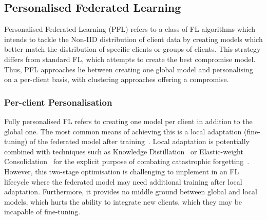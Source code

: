 \subsection{Personalised Federated Learning}

Personalised Federated Learning (PFL) refers to a class of FL algorithms which intends to tackle the Non-IID distribution of client data by creating models which better match the distribution of specific clients or groups of clients. This strategy differs from standard FL, which attempts to create the best compromise model. Thus, PFL approaches lie between creating one global model and personalising on a per-client basis, with clustering approaches offering a compromise.

\subsubsection{Per-client Personalisation}

Fully personalised FL refers to creating one model per client in addition to the global one. The most common means of achieving this is a local adaptation (fine-tuning) of the federated model after training~\citep{SalvagingFL,ThreeApproachesMansour,FinetuningIsFineFL,FinetuningIsFineFL}. Local adaptation is potentially combined with techniques such as Knowledge Distillation~\citep{DeepMutualLearning} or Elastic-weight Consolidation~\citep{EWC} for the explicit purpose of combating catastrophic forgetting~\citep{CatForgetting1}. However, this two-stage optimisation is challenging to implement in an FL lifecycle where the federated model may need additional training after local adaptation. Furthermore, it provides no middle ground between global and local models, which hurts the ability to integrate new clients, which they may be incapable of fine-tuning.

